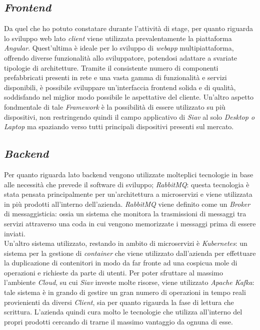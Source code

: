 \subsection{\textit{Frontend}}
Da quel che ho potuto constatare durante l'attività di stage, per quanto riguarda lo sviluppo web lato \textit{client} viene utilizzata prevalentamente la piattaforma \textit{\gls{Angular}}.
Quest'ultima è ideale per lo sviluppo di \textit{webapp} multipiattaforma, offrendo diverse funzionalità allo sviluppatore, potendosi adattare a svariate tipologie di architetture.
 Tramite il consistente numero di componenti prefabbricati presenti in rete e una vasta gamma di funzionalità e servizi disponibili, è possibile sviluppare un'interfaccia frontend solida e di qualità, soddisfando nel miglior modo possibile le aspettative del cliente. Un'altro aspetto fondmentale di tale \textit{\gls{Framework}} è la possibilità di essere utilizzato su più dispositivi, non restringendo quindi il campo applicativo di \textit{Siav} al solo \textit{Desktop o Laptop} ma spaziando verso tutti principali dispositivi presenti sul mercato.

\subsection{\textit{Backend}}
Per quanto riguarda lato backend vengono utilizzate molteplici tecnologie in base alle necessità che prevede il software di sviluppo;  \textit{RabbitMQ}: questa tecnologia è stata pensata principalmente per un'architettura a microservizi e viene utilizzata in più prodotti all'interno dell'azienda. \textit{RabbitMQ} viene definito come un \textit{\gls{Broker}} di messaggisticia: ossia un sistema che monitora la trasmissioni di messaggi tra servizi attraverso una coda in cui vengono memorizzate i messaggi prima di essere inviati.\\ Un'altro sistema utilizzato, restando in ambito di microservizi è \textit{Kubernetes}: un sistema per la gestione di \textit{container} che viene utilizzato dall'azienda per effettuare la duplicazione di contenitori in modo da far fronte ad una cospicua mole di operazioni e richieste da parte di utenti. Per poter sfruttare al massimo l'ambiente \textit{Cloud}, su cui \textit{Siav} investe molte risorse, viene utilizzato \textit{Apache Kafka}: tale sistema è in grando di gestire un gran numero di operazioni in tempo reali provienienti da diversi \textit{Client}, sia per quanto rigaurda la fase di lettura che scrittura. L'azienda quindi cura molto le tecnologie che utilizza all'interno del propri prodotti cercando di trarne il massimo vantaggio da ognuna di esse. 

